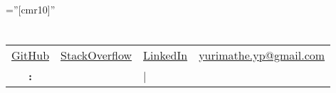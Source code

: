 \documentclass[a4paper,10pt]{article} %
\begin{document}
\pagestyle{empty} %

\font\fb=''[cmr10]'' %


\par{\bigskip\par} %

\section{\personalDataSection}

\begin{tabular}{clll}

	\faGithub \thinspace \href{https://github.com/Yuri-M-Dias}{GitHub}
	& \faStackOverflow \thinspace \href{http://stackoverflow.com/users/story/3312701}{StackOverflow}
	& \faLinkedin \thinspace \href{https://www.linkedin.com/in/yuri-pereira-b5b589a8/}{LinkedIn}
	& \faEnvelopeO \thinspace \href{mailto:yurimathe.yp@gmail.com}{yurimathe.yp@gmail.com} \\
	\bf \objectives: & \firstAim & | \secondAim & \\
\end{tabular}


\section{\workExperienceSection}
\end{document}
